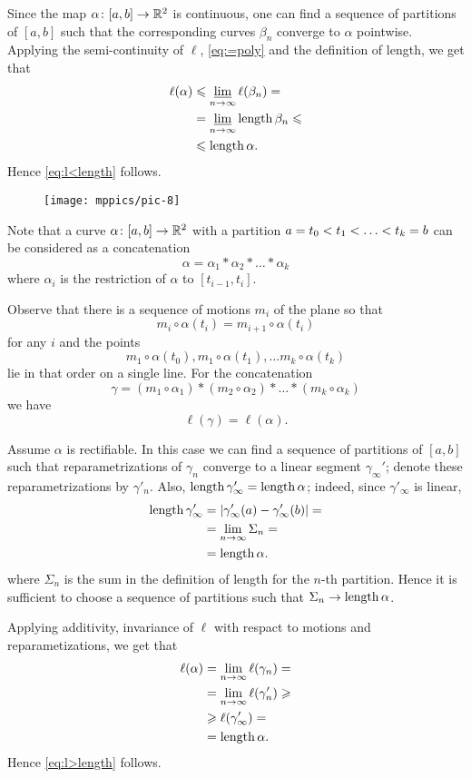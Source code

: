 Since the map  $\alpha\colon[a,b]\to \mathbb{R}^2$ is continuous,
one can find a sequence of partitions of $[a,b]$ such that the corresponding curves $\beta_n$ converge to $\alpha$ pointwise.
Applying the semi-continuity of $\ell$, \ref{eq:=poly} and the definition of length, we get that 
\begin{align*}
\ell(\alpha)&\leqslant \varliminf_{n\to\infty}\ell(\beta_n)=
\\
&=\varliminf_{n\to\infty}\mathop{\rm length}\nolimits\beta_n\leqslant
\\
&\leqslant\mathop{\rm length}\nolimits \alpha.
\end{align*}
Hence \ref{eq:l<length} follows.

\begin{wrapfigure}{r}{36 mm}
\vskip-4mm
\centering
\texttt{[image: mppics/pic-8]}
\end{wrapfigure}

Note that a curve $\alpha\colon[a,b]\to \mathbb{R}^2$ with a partition $a=t_0\z<t_1\z<\z\dots\z<t_k=b$ can be considered as a concatenation
\[\alpha=\alpha_1*\alpha_2*\dots*\alpha_k\]
where $\alpha_i$ is the restriction of $\alpha$ to $[t_{i-1},t_i]$.

Observe that there is a sequence of motions $m_i$ of the plane so that 
\[m_i\circ\alpha(t_i)=m_{i+1}\circ\alpha(t_i)\] 
for any $i$ and 
the points 
\[m_1\circ\alpha(t_0), m_1\circ\alpha(t_1),\dots m_k\circ\alpha(t_k)\] 
lie in that order on a single line.
For the concatenation 
\[\gamma=(m_1\circ\alpha_1)*(m_2\circ\alpha_2)*\dots*(m_k\circ\alpha_k)\]
we have
\[\ell(\gamma)=\ell(\alpha).\]

Assume $\alpha$ is rectifiable.
In this case we can find a sequence of partitions of $[a,b]$ such that reparametrizations of  $\gamma_n$ converge to a linear segment $\gamma_\infty'$;
denote these reparametrizations by $\gamma'_n$.
Also, $\length\gamma'_\infty\z=\length\alpha$;
indeed, since $\gamma'_\infty$ is linear,
\begin{align*}
\mathop{\rm length}\nolimits \gamma'_\infty&=|\gamma'_\infty (a)-\gamma'_\infty (b)|=
\\
&=\lim_{n\to\infty}\Sigma_n=
\\
&=\mathop{\rm length}\nolimits\alpha.
\end{align*}
where $\Sigma_n$ is the sum in the definition of length for the $n$-th partition.
Hence it is sufficient to choose a sequence of partitions such that $\Sigma_n\z\to\length\alpha$.

Applying additivity, invariance of $\ell$ with respact to motions and reparametizations, we get that
\begin{align*}
\ell(\alpha)&=\lim_{n\to\infty}\ell(\gamma_n)=
\\
&=\lim_{n\to\infty}\ell(\gamma_n')\geqslant
\\
&\geqslant \ell(\gamma_\infty')=
\\
&=\mathop{\rm length}\nolimits\alpha.
\end{align*}
Hence \ref{eq:l>length} follows.

